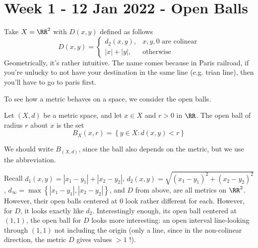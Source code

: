 \section{Week 1 - 12 Jan 2022 - Open Balls}
\begin{example}
  Take $X=\RR^2$ with $D(x,y)$ defined as follows
  \[D(x,y) = 
    \begin{cases}
      d_2(x,y), & x,y,0 \text{ are colinear} \\
      |x|+|y|, & \text{otherwise}
    \end{cases}
  \]
  Geometrically, it's rather intuitive. The name comes because in Paris
  railroad, if you're unlucky to not have your destination in the same line
  (e.g. trian line), then you'll have to go to paris first. 
\end{example}
To see how a metric behaves on a space, we consider the open balls.
\begin{definition}
  Let $(X,d)$ be a metric space, and let $x\in X$ and $r>0$ in $\RR$. The open
  ball of radius $r$ about $x$ is the set
  \[B_{X}(x,r)=\left\{ y\in X : d(x,y)<r \right\}\]
  \label{def:openBall}
\end{definition}
\begin{remark}
  We should write $B_{(X,d)}$, since the ball also depends on the metric, but we
  use the abbreviation.
\end{remark}
\begin{example}
  Recall $d_1(x,y)=|x_1-y_1|+|x_2-y_2|$,
  $d_2(x,y)=\sqrt{(x_1-y_1)^2+(x_2-y_2)^2}$, $d_{\infty}=\max\left\{
  |x_1-y_1|, |x_2-y_2| \right\}$, and $D$ from above, are all metrics on
  $\RR^2$. However, their open balls centered at $0$ look rather different for
  each. However, for $D$, it looks exactly like $d_2$. Interestingly enough,
  its open ball centered at $(1,1)$, the open ball for $D$ looks more
  interesting: an open interval line-looking through $(1,1)$ not including the
  origin (only a line, since in the non-colinear direction, the metric $D$ gives
  values $>1$ !).
\end{example}

